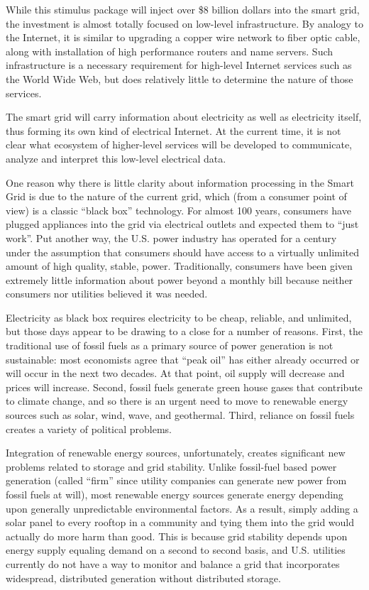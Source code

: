 While this stimulus package will inject over \$8 billion dollars into the
smart grid, the investment is almost totally focused on low-level
infrastructure.  By analogy to the Internet, it is similar to upgrading a
copper wire network to fiber optic cable, along with installation of high
performance routers and name servers.  Such infrastructure is a necessary
requirement for high-level Internet services such as the World Wide Web,
but does relatively little to determine the nature of those services. 

The smart grid will carry information about electricity as well as
electricity itself, thus forming its own kind of electrical Internet. At
the current time, it is not clear what ecosystem of higher-level services
will be developed to communicate, analyze and interpret this low-level
electrical data.

One reason why there is little clarity about information processing in the
Smart Grid is due to the nature of the current grid, which (from a consumer
point of view) is a classic ``black box'' technology.  For almost 100
years, consumers have plugged appliances into the grid via electrical
outlets and expected them to ``just work''.  Put another way, the
U.S. power industry has operated for a century under the assumption that
consumers should have access to a virtually unlimited amount of high
quality, stable, power.  Traditionally, consumers have been given extremely
little information about power beyond a monthly bill because neither
consumers nor utilities believed it was needed.

Electricity as black box requires electricity to be cheap, reliable, and
unlimited, but those days appear to be drawing to a close for a number of
reasons.  First, the traditional use of fossil fuels as a primary source of
power generation is not sustainable: most economists agree that ``peak
oil'' has either already occurred or will occur in the next two decades. At
that point, oil supply will decrease and prices will increase.  Second,
fossil fuels generate green house gases that contribute to climate change,
and so there is an urgent need to move to renewable energy sources such as
solar, wind, wave, and geothermal.  Third, reliance on fossil fuels creates
a variety of political problems.

Integration of renewable energy sources, unfortunately, creates significant
new problems related to storage and grid stability.  Unlike fossil-fuel
based power generation (called ``firm'' since utility companies can
generate new power from fossil fuels at will), most renewable energy
sources generate energy depending upon generally unpredictable
environmental factors.  As a result, simply adding a solar panel to every
rooftop in a community and tying them into the grid would actually do more
harm than good.  This is because grid stability depends upon energy supply
equaling demand on a second to second basis, and U.S. utilities currently
do not have a way to monitor and balance a grid that incorporates
widespread, distributed generation without distributed storage. 

